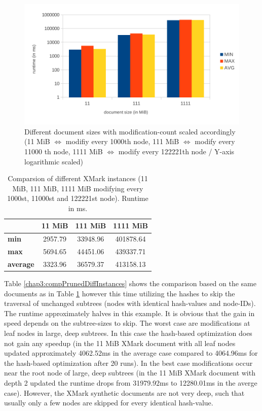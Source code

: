 \begin{figure}[tb]
\centering
\includegraphics[width=\textwidth]{figures/diff-docsize-scale}
\caption{Different document sizes with modification-count scaled accordingly (11 MiB $\Leftrightarrow$ modifiy every 1000th node, 111 MiB $\Leftrightarrow$ modify every 11000 th node, 1111 MiB $\Leftrightarrow$ modify every 122221th node / Y-axis logarithmic scaled)} 
\label{fig:docScaling}
\end{figure}

\begin{table}[tb]
\centering 
\begin{tabular}[r]{|l|c|c|c|} 
\hline
& \textbf{11 MiB} & \textbf{111 MiB} & \textbf{1111 MiB}\\
\hline
\hline
\textbf{min} & 2957.79 & 33948.96 & 401878.64\\
\hline
\textbf{max} & 5694.65 & 44451.06 & 439337.71\\
\hline
\textbf{average} & 3323.96 & 36579.37 & 413158.13\\
\hline
\end{tabular}
\label{chap3:compDiffInstances}
\vspace{0.5em} 
\caption{Comparsion of different XMark instances (11 MiB, 111 MiB, 1111 MiB modifying every 1000st, 11000st and 122221st node). Runtime in ms.}
\end{table}

Table \ref{chap3:compPrunedDiffInstances} shows the comparison based on the same documents as in Table \ref{chap3:compDiffInstances} however this time utilizing the hashes to skip the traversal of unchanged subtrees (nodes with identical hash-values and node-IDs). The runtime approximately halves in this example. It is obvious that the gain in speed depends on the subtree-sizes to skip. The worst case are modifications at leaf nodes in large, deep subtrees. In this case the hash-based optimization does not gain any speedup (in the 11 MiB XMark document with all leaf nodes updated approximately 4062.52ms in the average case compared to 4064.96ms for the hash-based optimization after 20 runs). In the best case modifications occur near the root node of large, deep subtrees (in the 11 MiB XMark document with depth 2 updated the runtime drops from 31979.92ms to 12280.01ms in the averge case). However, the XMark synthetic documents are not very deep, such that usually only a few nodes are skipped for every identical hash-value.

